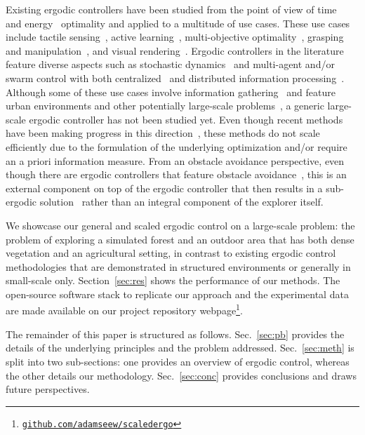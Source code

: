 \documentclass[letterpaper,10pt,conference,twoside]{IEEEtran}
\theoremstyle{definition}
\begin{document}
Existing ergodic controllers have been studied from the point of view of time~\cite{dong2023time} and energy~\cite{seewald2024energy,naveed2024eclares} optimality and applied to a multitude of use cases. These use cases include tactile sensing~\cite{abraham2017ergodic}, active learning~\cite{abraham2021ergodic}, multi-objective optimality~\cite{ren2023pareto,srinivasan2023multi}, grasping and manipulation~\cite{shetty2022ergodic,bilaloglu2023whole}, and visual rendering~\cite{low2022drozbot,prabhakar2020autonomous}. Ergodic controllers in the literature feature diverse aspects such as stochastic dynamics~\cite{torre2016ergodic,ayvali2017ergodic} and multi-agent and/or swarm control with both centralized~\cite{seewald2024energy,rao2024learning} and distributed information processing~\cite{prabhakar2020ergodic,coffin2022multi}. Although some of these use cases involve information gathering~\cite{dressel2018optimality} and feature urban environments and other potentially large-scale problems~\cite{prabhakar2020ergodic,rao2023multi}, a generic large-scale ergodic controller has not been studied yet. Even though recent methods have been making progress in this direction~\cite{whittemeyer2023bi,seewald2024energy,naveed2024eclares,dong2023time}, these methods do not scale efficiently due to the formulation of the underlying optimization and/or require an a priori information measure. From an obstacle avoidance perspective, even though there are ergodic controllers that feature obstacle avoidance~\cite{lerch2023safety}, this is an external component on top of the ergodic controller that then results in a sub-ergodic solution~\cite{dong2023time} rather than an integral component of the explorer itself.

We showcase our general and scaled ergodic control on a large-scale problem: the problem of exploring a simulated forest and an outdoor area that has both dense vegetation and an agricultural setting, in contrast to existing ergodic control methodologies that are demonstrated in structured environments or generally in small-scale only. Section~\ref{sec:res} shows the performance of our methods. The open-source software stack to replicate our approach and the experimental data are made available on our project repository webpage\footnote{\href{https://github.com/adamseew/scaledergo}{\tt github.com/adamseew/scaledergo}}.

The remainder of this paper is structured as follows. Sec.~\ref{sec:pb} provides the details of the underlying principles and the problem addressed. Sec.~\ref{sec:meth} is split into two sub-sections: one provides an overview of ergodic control, whereas the other details our methodology. Sec.~\ref{sec:conc} provides conclusions and draws future perspectives.
\end{document}
